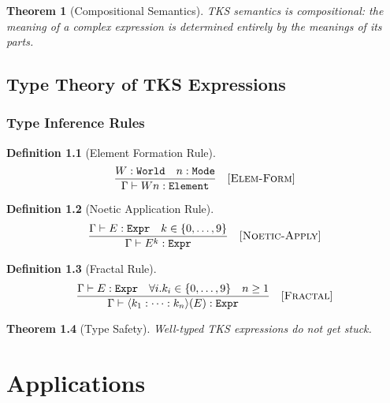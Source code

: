 \documentclass[11pt,twoside,openright]{book}
\theoremstyle{definition}
\newtheorem{definition}{Definition}[chapter]
\theoremstyle{plain}
\newtheorem{theorem}[definition]{Theorem}
\theoremstyle{remark}
\newcommand{\types}{\vdash}
\begin{document}
\begin{theorem}[Compositional Semantics]
\label{thm:compositional}
TKS semantics is compositional: the meaning of a complex expression is determined entirely by the meanings of its parts.
\end{theorem}

\chapter{Type Theory of TKS Expressions}
\label{ch:type-theory}

\section{Type Inference Rules}

\begin{definition}[Element Formation Rule]
\label{def:elem-form}
\[
\frac{W : \mathtt{World} \quad n : \mathtt{Mode}}{\Gamma \types Wn : \mathtt{Element}} \quad [\textsc{Elem-Form}]
\]
\end{definition}

\begin{definition}[Noetic Application Rule]
\label{def:noetic-rule}
\[
\frac{\Gamma \types E : \mathtt{Expr} \quad k \in \{0,\ldots,9\}}{\Gamma \types E^k : \mathtt{Expr}} \quad [\textsc{Noetic-Apply}]
\]
\end{definition}

\begin{definition}[Fractal Rule]
\label{def:fractal-rule}
\[
\frac{\Gamma \types E : \mathtt{Expr} \quad \forall i. k_i \in \{0,\ldots,9\} \quad n \geq 1}{\Gamma \types \langle k_1 : \cdots : k_n \rangle(E) : \mathtt{Expr}} \quad [\textsc{Fractal}]
\]
\end{definition}

\begin{theorem}[Type Safety]
\label{thm:type-safety}
Well-typed TKS expressions do not get stuck.
\end{theorem}

\part{Applications}
\end{document}
